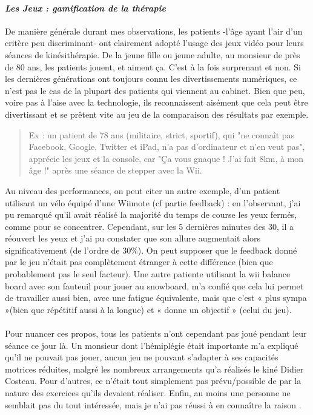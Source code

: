 		\paragraph{\emph{Les Jeux : gamification de la thérapie}\\}
De manière générale durant mes observations, les patients -l'âge ayant l'air d'un critère peu discriminant- ont clairement adopté l'usage des jeux vidéo pour leurs séances de kinésithérapie. De la jeune fille ou jeune adulte, au monsieur de près de 80 ans, les patients jouent, et aiment ça. C'est à la fois surprenant et non. Si les dernières générations ont toujours connu les divertissements numériques, ce n'est pas le cas de la plupart des patients qui viennent au cabinet. Bien que peu, voire pas à l'aise avec la technologie, ils reconnaissent aisément que cela peut être divertissant et se prêtent vite au jeu de la comparaison des résultats par exemple.
\begin{quotation}
Ex : un patient de 78 ans (militaire, strict, sportif), qui "ne connaît pas Facebook, Google, Twitter et iPad, n'a pas d'ordinateur et n'en veut pas", apprécie les jeux et la console, car "Ça vous gnaque ! J'ai fait 8km, à mon âge !" après une séance de stepper avec la Wii.    
\end{quotation}
Au niveau des performances, on peut citer un autre exemple, d'un patient utilisant un vélo équipé d'une Wiimote (cf partie feedback) : en l'observant, j'ai pu remarqué qu'il avait réalisé la majorité du temps de course les yeux fermés, comme pour se concentrer. Cependant, sur les 5 dernières minutes des 30, il a réouvert les yeux et j'ai pu constater que son allure augmentait alors significativement (de l'ordre de 30\%). On peut supposer que le feedback donné par le jeu n'était pas complètement étranger à cette différence (bien que probablement pas le seul facteur).    
Une autre patiente utilisant la wii balance board avec son fauteuil pour jouer au snowboard, m'a confié que cela lui permet de travailler aussi bien, avec une fatigue équivalente, mais que c'est « plus sympa »(bien que répétitif aussi à la longue) et « donne un objectif » (celui du jeu).

\paragraph{}Pour nuancer ces propos, tous les patients n'ont cependant pas joué pendant leur séance ce jour là. Un monsieur dont l'hémiplégie était importante m'a expliqué qu'il ne pouvait pas jouer, aucun jeu ne pouvant s'adapter à ses capacités motrices réduites, malgré les nombreux arrangements qu'a réalisés le kiné Didier Costeau. Pour d'autres, ce n'était tout simplement pas prévu/possible de par la nature des exercices qu'ils devaient réaliser. Enfin, au moins une personne ne semblait pas du tout intéressée, mais je n'ai pas réussi à en connaître la raison .

